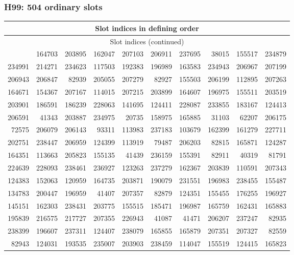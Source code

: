 \documentclass[11pt]{article}
\numberwithin{equation}{section}
\theoremstyle{definition}
\theoremstyle{remark}
\begin{document}
\subsubsection*{H99: 504 ordinary slots}
{\scriptsize\setlength{\tabcolsep}{5pt}\begin{longtable}{rrrrrrrrrr}
\toprule\multicolumn{10}{c}{Slot indices in defining order}\\\midrule\endfirsthead
\toprule\multicolumn{10}{c}{Slot indices (continued)}\\\midrule\endhead
\bottomrule\endfoot
206191 & 164703 & 203895 & 162047 & 207103 & 206911 & 237695 & 38015 & 155517 & 234879\\
234991 & 214271 & 234623 & 117503 & 192383 & 196989 & 163583 & 234943 & 206967 & 207199\\
206943 & 206847 & 82939 & 205055 & 207279 & 82927 & 155503 & 206199 & 112895 & 207263\\
164671 & 154367 & 207167 & 114015 & 207215 & 203899 & 164607 & 196975 & 155511 & 203519\\
203901 & 186591 & 186239 & 228063 & 141695 & 124411 & 228087 & 233855 & 183167 & 124413\\
206591 & 41343 & 203887 & 234975 & 20735 & 158975 & 165885 & 31103 & 62207 & 206175\\
72575 & 206079 & 206143 & 93311 & 113983 & 237183 & 103679 & 162399 & 161279 & 227711\\
202751 & 238447 & 206959 & 124399 & 113919 & 79487 & 206203 & 82815 & 165871 & 124287\\
164351 & 113663 & 205823 & 155135 & 41439 & 236159 & 155391 & 82911 & 40319 & 81791\\
224639 & 228093 & 238461 & 236927 & 123263 & 237279 & 162367 & 203839 & 110591 & 207343\\
124383 & 152063 & 120959 & 164735 & 203871 & 190079 & 231551 & 196983 & 238455 & 155487\\
134783 & 200447 & 196959 & 41407 & 207357 & 82879 & 124351 & 155455 & 176255 & 196927\\
145151 & 162303 & 238431 & 203775 & 155515 & 185471 & 196987 & 165759 & 162431 & 165883\\
195839 & 216575 & 217727 & 207355 & 226943 & 41087 & 41471 & 206207 & 237247 & 82935\\
238399 & 196607 & 237311 & 124407 & 238079 & 165855 & 165879 & 207351 & 207327 & 82559\\
82943 & 124031 & 193535 & 235007 & 203903 & 238459 & 114047 & 155519 & 124415 & 165823\\

\end{longtable}}
\end{document}
